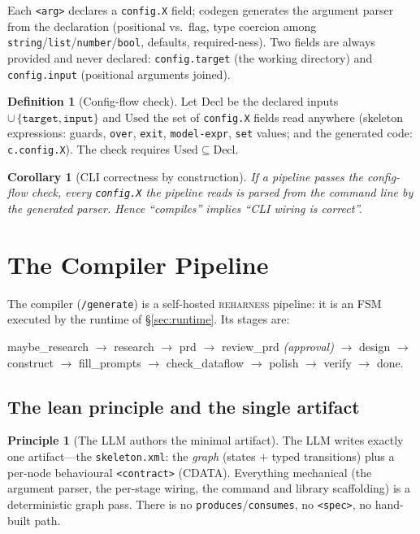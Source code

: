 \documentclass[11pt]{article}
\theoremstyle{plain}
\newtheorem{corollary}[theorem]{Corollary}
\theoremstyle{definition}
\newtheorem{definition}[theorem]{Definition}
\newtheorem{principle}[theorem]{Principle}
\theoremstyle{remark}
\newcommand{\reharness}{\textsc{reharness}}
\newcommand{\code}[1]{\texttt{#1}}
\newcommand{\state}[1]{\textsf{#1}}
\begin{document}
Each \code{<arg>} declares a \code{config.X} field; codegen generates the argument
parser from the declaration (positional vs.\ flag, type coercion among
\code{string}/\code{list}/\code{number}/\code{bool}, defaults, required-ness). Two
fields are always provided and never declared: \code{config.target} (the working
directory) and \code{config.input} (positional arguments joined).

\begin{definition}[Config-flow check]
Let $\mathrm{Decl}$ be the declared inputs $\cup\, \{\code{target}, \code{input}\}$
and $\mathrm{Used}$ the set of \code{config.X} fields read anywhere (skeleton
expressions: guards, \code{over}, \code{exit}, \code{model-expr}, \code{set} values;
and the generated code: \code{c.config.X}). The check requires $\mathrm{Used}
\subseteq \mathrm{Decl}$.
\end{definition}

\begin{corollary}[CLI correctness by construction]
If a pipeline passes the config-flow check, every \code{config.X} the pipeline reads
is parsed from the command line by the generated parser. Hence ``compiles''
implies ``CLI wiring is correct''.
\end{corollary}

\section{The Compiler Pipeline}\label{sec:compiler}

The compiler (\code{/generate}) is a self-hosted \reharness{} pipeline: it is an
FSM executed by the runtime of \S\ref{sec:runtime}. Its stages are:
\begin{center}\small
\state{maybe\_research} $\to$ \state{research} $\to$ \state{prd} $\to$
\state{review\_prd} \emph{(approval)} $\to$ \state{design} $\to$ \state{construct}
$\to$ \state{fill\_prompts} $\to$ \state{check\_dataflow} $\to$ \state{polish}
$\to$ \state{verify} $\to$ \state{done}.
\end{center}

\subsection{The lean principle and the single artifact}

\begin{principle}[The LLM authors the minimal artifact]\label{prin:lean}
The LLM writes exactly one artifact---the \code{skeleton.xml}: the \emph{graph}
(states $+$ typed transitions) plus a per-node behavioural \code{<contract>}
(CDATA). Everything mechanical (the argument parser, the per-stage wiring, the
command and library scaffolding) is a deterministic graph pass. There is no
\code{produces}/\code{consumes}, no \code{<spec>}, no hand-built path.
\end{principle}
\end{document}
